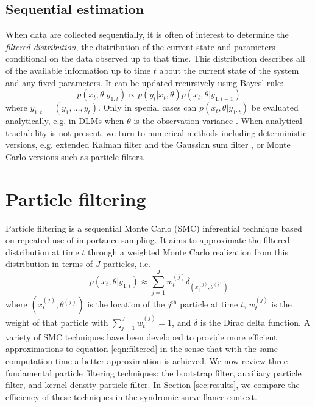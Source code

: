 \documentclass{elsarticle}
\begin{document}
\subsection{Sequential estimation \label {sec:sequential}}

When data are collected sequentially, it is often of interest to determine the \emph{filtered distribution}, the distribution of the current state and parameters conditional on the data observed up to that time. This distribution describes all of the available information up to time $t$ about the current state of the system and any fixed parameters. It can be updated recursively using Bayes' rule:
\begin{equation}
p(x_t,\theta| y_{1:t}) \propto p(y_t|x_t,\theta)p(x_t,\theta|y_{1:t-1}) \label{eqn:filtered}
\end{equation}
where $y_{1:t} = (y_1,\ldots,y_t)$. Only in special cases can $p(x_t,\theta| y_{1:t})$ be evaluated analytically, e.g. in DLMs when $\theta$ is the observation variance \cite[Sec 4.3,][]{petris2009dynamic}. When analytical tractability is not present, we turn to numerical methods including deterministic versions, e.g. extended Kalman filter and the Gaussian sum filter \citep{Alsp:Sore:nonl:1972}, or Monte Carlo versions such as particle filters.

\section{Particle filtering \label{sec:filtering}}

Particle filtering is a sequential Monte Carlo (SMC) inferential technique based on repeated use of importance sampling. It aims to approximate the filtered distribution at time $t$ through a weighted Monte Carlo realization from this distribution in terms of $J$ particles, i.e.
\begin{equation}
p(x_t,\theta| y_{1:t}) \approx \sum_{j=1}^J w_t^{(j)} \delta_{\left(x_t^{(j)},\theta^{(j)}\right)} \label{eqn:approx}
\end{equation}
where $\left(x_t^{(j)},\theta^{(j)}\right)$ is the location of the $j^{\mbox{th}}$ particle at time $t$, $w_t^{(j)}$ is the weight of that particle with $\sum_{j=1}^J w_t^{(j)}=1$, and $\delta$ is the Dirac delta function. A variety of SMC techniques have been developed to provide more efficient approximations to equation \eqref{eqn:filtered} in the sense that with the same computation time a better approximation is achieved. We now review three fundamental particle filtering techniques: the bootstrap filter, auxiliary particle filter, and kernel density particle filter. In Section \ref{sec:results}, we compare the efficiency of these techniques in the syndromic surveillance context.
\end{document}
